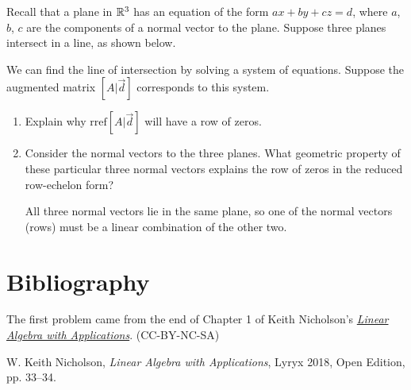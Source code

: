 \documentclass{ximera}
\begin{document}
\begin{problem}\label{prob:normalVectInOnePlane}
    Recall that a plane in $\mathbb{R}^3$ has an equation of the form $ax+by+cz=d$, where $a$, $b$, $c$ are the components of a normal vector to the plane.  Suppose three planes intersect in a line, as shown below.
    \begin{center}
\end{center}     
We can find the line of intersection by solving a system of equations.  Suppose the augmented matrix $[A | \vec{d}]$ corresponds to this system.
\begin{enumerate}
    \item Explain why $\text{rref}[A | \vec{d}]$ will have a row of zeros.

\item Consider the normal vectors to the three planes.  What geometric property of these particular three normal vectors explains the row of zeros in the reduced row-echelon form?
\begin{hint}
    All three normal vectors lie in the same plane, so one of the normal vectors (rows) must be a linear combination of the other two.
\end{hint}
\end{enumerate}     
    

\end{problem}


\section*{Bibliography}
The first problem came from the end of Chapter 1 of Keith Nicholson's \href{https://open.umn.edu/opentextbooks/textbooks/linear-algebra-with-applications}{\it Linear Algebra with Applications}. (CC-BY-NC-SA)

W. Keith Nicholson, {\it Linear Algebra with Applications}, Lyryx 2018, Open Edition, pp. 33--34. 
\end{document}
